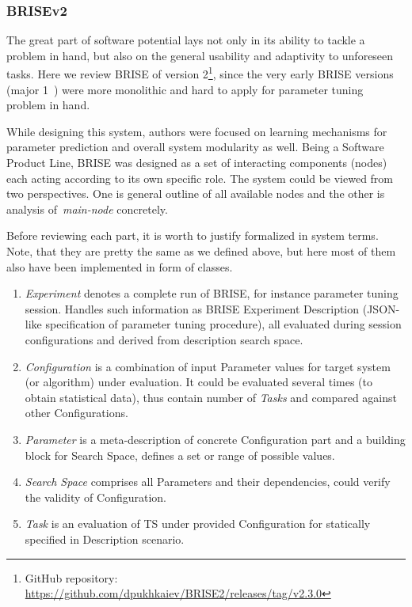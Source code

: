 \subsubsection{BRISEv2~\cite{brise2spl}}
The great part of software potential lays not only in its ability to tackle a problem in hand, but also on the general usability and adaptivity to unforeseen tasks.
Here we review BRISE of version 2\footnote{GitHub repository: \url{https://github.com/dpukhkaiev/BRISE2/releases/tag/v2.3.0}}, since the very early BRISE versions (major 1~\cite{brise1monolite}) were more monolithic and hard to apply for parameter tuning problem in hand.

While designing this system, authors were focused on learning mechanisms for parameter prediction and overall system modularity as well.
Being a Software Product Line, BRISE was designed as a set of interacting components (nodes) each acting according to its own specific role. 
The system could be viewed from two perspectives. One is general outline of all available nodes and the other is analysis of~\textit{main-node} concretely.

Before reviewing each part, it is worth to justify formalized in system terms. Note, that they are pretty the same as we defined above, but here most of them also have been implemented in form of classes.
\begin{enumerate}
	\item \emph{Experiment} denotes a complete run of BRISE, for instance parameter tuning session. Handles such information as BRISE Experiment Description (JSON-like specification of parameter tuning procedure), all evaluated during session configurations and derived from description search space.

	\item \emph{Configuration} is a combination of input Parameter values for target system (or algorithm) under evaluation. It could be evaluated several times (to obtain statistical data), thus contain number of \emph{Tasks} and compared against other Configurations.

	\item \emph{Parameter} is a meta-description of concrete Configuration part and a building block for Search Space, defines a set or range of possible values. 

	\item \emph{Search Space} comprises all Parameters and their dependencies, could verify the validity of Configuration.

	\item \emph{Task} is an evaluation of TS under provided Configuration for statically specified in Description scenario.
\end{enumerate}

